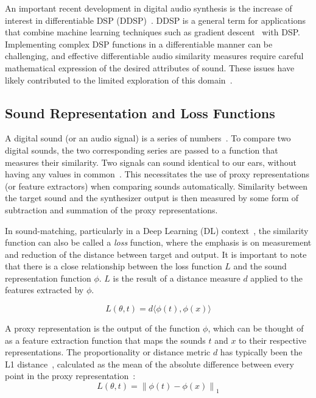 \documentclass[lettersize,journal]{IEEEtran}
\providecommand{\gls}[1]{#1}
\begin{document}
An important recent development in digital audio synthesis is the increase of interest in differentiable DSP (\gls{DDSP})~\cite{engel2020ddsp}. DDSP is a general term for applications that combine machine learning techniques such as gradient descent~\cite{goodfellow2016deep,boyd2004convex} with DSP. Implementing complex DSP functions in a differentiable manner can be challenging, and effective differentiable audio similarity measures require careful mathematical expression of the desired attributes of sound. These issues have likely contributed to the limited exploration of this domain~\cite{masuda2021soundmatch,vahidi2023mesostructures,uzrad2024diffmoog}. 


\subsection{Sound Representation and Loss Functions}
\label{sec:loss_funcs}
A digital sound (or an audio signal) is a series of numbers~\cite{smith1991viewpoints,smith2007mathematics}. To compare two digital sounds, the two corresponding series are passed to a function that measures their similarity. Two signals can sound identical to our ears, without having any values in common~\cite{moore2012introduction}. This necessitates the use of proxy representations (or feature extractors) when comparing sounds automatically. Similarity between the target sound and the synthesizer output is then measured by some form of subtraction and summation of the proxy representations.

In sound-matching, particularly in a Deep Learning (\gls{DL}) context~\cite{goodfellow2016deep}, the similarity function can also be called a \textit{loss} function, where the emphasis is on measurement and reduction of the distance between target and output. It is important to note that there is a close relationship between the loss function $L$ and the sound representation function $\phi$. $L$ is the result of a distance measure $d$ applied to the features extracted by $\phi$. 

\[
L(\theta, t) = d\langle\phi(t),\phi(x)\rangle
\]

\noindent

A proxy representation is the output of the function \( \phi \), which can be thought of as a feature extraction function that maps the sounds \( t \) and \( x \) to their respective representations. 
The proportionality or distance metric $d$ has typically been the L1 distance~\cite{turian2020sorry,richard2025model}, calculated as the mean of the absolute difference between every point in the proxy representation~\cite{engel2020ddsp,vahidi2023mesostructures}:
\[
L(\theta, t) = \left\| \phi(t) - \phi(x) \right\|_1
\]
\end{document}
